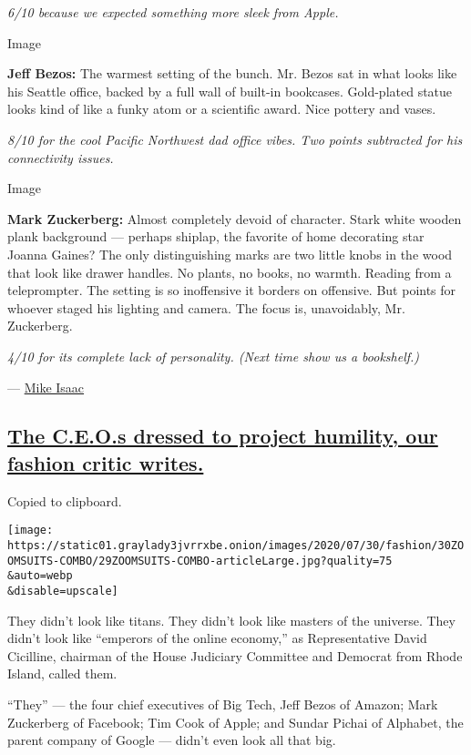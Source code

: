 \emph{6/10 because we expected something more sleek from Apple.}

Image

\textbf{Jeff Bezos:} The warmest setting of the bunch. Mr. Bezos sat in
what looks like his Seattle office, backed by a full wall of built-in
bookcases. Gold-plated statue looks kind of like a funky atom or a
scientific award. Nice pottery and vases.

\emph{8/10 for the cool Pacific Northwest dad office vibes. Two points
subtracted for his connectivity issues.}

Image

\textbf{Mark Zuckerberg:} Almost completely devoid of character. Stark
white wooden plank background --- perhaps shiplap, the favorite of home
decorating star Joanna Gaines? The only distinguishing marks are two
little knobs in the wood that look like drawer handles. No plants, no
books, no warmth. Reading from a teleprompter. The setting is so
inoffensive it borders on offensive. But points for whoever staged his
lighting and camera. The focus is, unavoidably, Mr. Zuckerberg.

\emph{4/10 for its complete lack of personality. (Next time show us a
bookshelf.)}

--- \href{https://www.nytimes3xbfgragh.onion/by/mike-isaac}{Mike Isaac}

\hypertarget{the-ceos-dressed-to-project-humility-our-fashion-critic-writes}{%
\subsection{\texorpdfstring{\protect\hyperlink{the-ceos-dressed-to-project-humility-our-fashion-critic-writes}{The
C.E.O.s dressed to project humility, our fashion critic
writes.}}{The C.E.O.s dressed to project humility, our fashion critic writes.}}\label{the-ceos-dressed-to-project-humility-our-fashion-critic-writes}}

Copied to clipboard.

\texttt{[image: https://static01.graylady3jvrrxbe.onion/images/2020/07/30/fashion/30ZOOMSUITS-COMBO/29ZOOMSUITS-COMBO-articleLarge.jpg?quality=75\\\&auto=webp\\\&disable=upscale]}

They didn't look like titans. They didn't look like masters of the
universe. They didn't look like ``emperors of the online economy,'' as
Representative David Cicilline, chairman of the House Judiciary
Committee and Democrat from Rhode Island, called them.

``They'' --- the four chief executives of Big Tech, Jeff Bezos of
Amazon; Mark Zuckerberg of Facebook; Tim Cook of Apple; and Sundar
Pichai of Alphabet, the parent company of Google --- didn't even look
all that big.

